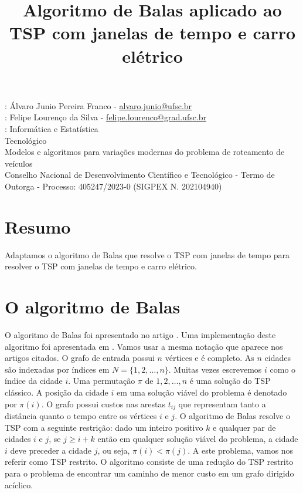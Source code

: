 \documentclass{article}
\title{Algoritmo de Balas aplicado ao TSP com janelas de tempo e carro elétrico}
\begin{document}
\maketitle


:  Álvaro Junio Pereira Franco - \url{alvaro.junio@ufsc.br}\\

: Felipe Lourenço da Silva - \url{felipe.lourenco@grad.ufsc.br}\\

: Informática e Estatística\\

 Tecnológico\\

 Modelos e algoritmos para variações modernas do problema de roteamento de veículos\\

 Conselho Nacional de Desenvolvimento Científico e Tecnológico - Termo de Outorga - Processo: 405247/2023-0 (SIGPEX N. 202104940)

\section*{Resumo}
Adaptamos o algoritmo de Balas que resolve o TSP com janelas de tempo para resolver o TSP com janelas de tempo e carro elétrico.

\section*{O algoritmo de Balas}
O algoritmo de Balas foi apresentado no artigo \cite{Ba}. Uma implementação deste algoritmo foi apresentada em \cite{BS}. Vamos usar a mesma notação que aparece nos artigos citados. O grafo de entrada possui $n$ vértices e é completo. As $n$ cidades são indexadas por índices em $N=\{1, 2, \dots, n\}$. Muitas vezes escrevemos $i$ como o índice da cidade $i$. Uma permutação $\pi$ de $1, 2, \dots, n$ é uma solução do TSP clássico. A posição da cidade $i$ em uma solução viável do problema é denotado por $\pi(i)$. O grafo possui custos nas arestas $t_{ij}$ que representam tanto a distância quanto o tempo entre os vértices $i$ e $j$. O algoritmo de Balas resolve o TSP com a seguinte restrição: dado um inteiro positivo $k$ e qualquer par de cidades $i$ e $j$, se $j \geq i + k$ então em qualquer solução viável do problema, a cidade $i$ deve preceder a cidade $j$, ou seja, $\pi(i) < \pi(j)$. A este problema, vamos nos referir como TSP restrito. O algoritmo consiste de uma redução do TSP restrito para o problema de encontrar um caminho de menor custo em um grafo dirigido acíclico.
\end{document}
